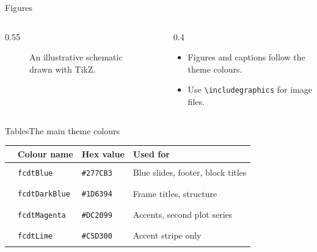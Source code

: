 \documentclass[aspectratio=169, 11pt]{beamer}
\begin{document}
\begin{frame}{Figures}
  \begin{columns}[c]
    \begin{column}{0.55\textwidth}
      \begin{figure}
        \centering
        \caption{An illustrative schematic drawn with TikZ.}
      \end{figure}
    \end{column}
    \begin{column}{0.4\textwidth}
      \begin{itemize}
        \item Figures and captions follow the theme colours.
        \item Use \texttt{\textbackslash{}includegraphics} for image files.
      \end{itemize}
    \end{column}
  \end{columns}
\end{frame}

\begin{frame}{Tables}{The main theme colours}
  \centering
  \begin{tabular}{@{}llll@{}}
    \toprule
    & Colour name & Hex value & Used for \\
    \midrule
    \textcolor{fcdtBlue}{\rule{1.2em}{1.2ex}}     & \texttt{fcdtBlue}     & \texttt{\#277CB3} & Blue slides, footer, block titles \\
    \textcolor{fcdtDarkBlue}{\rule{1.2em}{1.2ex}} & \texttt{fcdtDarkBlue} & \texttt{\#1D6394} & Frame titles, structure \\
    \textcolor{fcdtMagenta}{\rule{1.2em}{1.2ex}}  & \texttt{fcdtMagenta}  & \texttt{\#DC2099} & Accents, second plot series \\
    \textcolor{fcdtLime}{\rule{1.2em}{1.2ex}}     & \texttt{fcdtLime}     & \texttt{\#C5D300} & Accent stripe only \\
    \bottomrule
  \end{tabular}
\end{frame}
\end{document}
